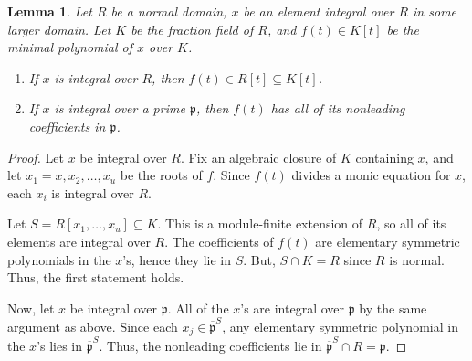 \documentclass{amsart}[12pt]
\newcommand{\p}{{\mathfrak p}}
\numberwithin{equation}{section}
\theoremstyle{plain} %
\newtheorem{lemma}[equation]{Lemma}
\theoremstyle{definition}
\theoremstyle{remark}
\begin{document}
\begin{lemma} Let $R$ be a normal domain, $x$ be an element integral over $R$ in some larger domain. Let $K$ be the fraction field of $R$, and $f(t)\in K[t]$ be the minimal polynomial of $x$ over $K$.
	\begin{enumerate}
		\item If $x$ is integral over $R$, then $f(t)\in R[t]\subseteq K[t]$.
		\item If $x$ is integral over a prime $\p$, then $f(t)$ has all of its nonleading coefficients in $\p$.
	\end{enumerate}
\end{lemma}
\begin{proof}
	Let $x$ be integral over $R$. Fix an algebraic closure of $K$ containing $x$, and let $x_1=x,x_2,\dots,x_u$ be the roots of $f$. Since $f(t)$ divides a monic equation for $x$, each $x_i$ is integral over $R$.
	
	Let $S=R[x_1,\dots,x_u] \subseteq \overline{K}$. This is a module-finite extension of $R$, so all of its elements are integral over $R$. The coefficients of $f(t)$ are elementary symmetric polynomials in the $x$'s, hence they lie in $S$. But, $S\cap K = R$ since $R$ is normal. Thus, the first statement holds.
	
	Now, let $x$ be integral over $\p$. All of the $x$'s are integral over $\p$ by the same argument as above. Since each $x_j\in \overline{\p}^S$, any elementary symmetric polynomial in the $x$'s lies in $\overline{\p}^S$. Thus, the nonleading coefficients lie in $\overline{\p}^S \cap R = \p$.
\end{proof}
\end{document}
